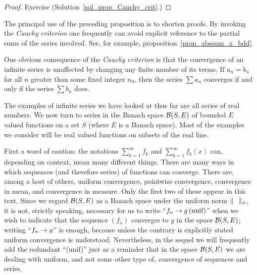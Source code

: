\begin{proof} Exercise   (Solution~\ref{sol_prop_Cauchy_crit}.)  \ns  \end{proof}

The principal use of the preceding proposition is to shorten proofs.  By invoking the
\emph{Cauchy criterion} one frequently can avoid explicit reference to the partial sums of the
series involved. See, for example, proposition~\ref{prop_abssum_x_bdd}.

One obvious consequence of the \emph{Cauchy criterion} is that the convergence of an infinite
series is unaffected by changing any finite number of its terms.  If $a_n = b_n$ for all $n$
greater than some fixed integer $n_0$, then the series $\sum a_n$ converges if and only if the
series $\sum b_n$ does.

The examples of infinite series we have looked at thus far are all series of real numbers.  We
now turn to series in the Banach space $\mathcal{B}(S,E)$ of bounded $E$ valued functions on a set
$S$ (where $E$ is a Banach space).  Most of the examples we consider will be real valued
functions on subsets of the real line.

First a word of caution: the notations $\sum_{k=1}^\infty f_k$ and $\sum_{k=1}^\infty f_k(x)$
can, depending on context, mean many different things.  There are many ways in which sequences
(and therefore series) of functions can converge.  There are, among a host of others, uniform
convergence, pointwise convergence, convergence in mean, and convergence in measure.  Only the
first two of these appear in this text.  Since we regard $\mathcal{B}(S,E)$ as a Banach space under
the uniform norm $\lVert\hphantom{A}\rVert_u$, it is not, strictly speaking, necessary for us to
write ``$f_n \rightarrow g \text{\,(unif)}$'' when we wish to indicate that the sequence $(f_n)$
converges to $g$ in the space $\mathcal{B}(S,E)$; writing ``$f_n \rightarrow g$'' is enough, because
unless the contrary is explicitly stated uniform convergence is understood.  Nevertheless, in
the sequel we will frequently add the redundant ``(unif)'' just as a reminder that in the
space $\mathcal{B}(S,E)$ we are dealing with uniform, and not some other type of, convergence of
sequences and series.


